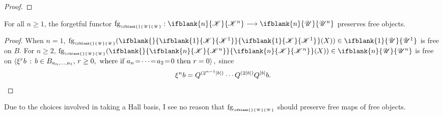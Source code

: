 \documentclass[10pt]{article}
\newcommand{\RestLie}[1]%
{\ifblank{#1}{\mathsf{r}{\scrL}}{\mathsf{r}{\scrL}^{#1}}}
\newcommand{\LL}[1]{\ifblank{#1}{\scrK}{\scrK^{#1}}}
\newcommand{\nontop}[1]{\ifblank{#1}{\scrU}{\scrU^{#1}}}
\newcommand{\iteratedrestn}[2]{\xi^{#2}{#1}}
\newcommand{\forget}[1]{\mathrm{fg}_{\smash{\mbox{\tiny $#1$}}}}
\newcommand{\Fr}[2][]{\ifblank{#1}{#2}{#2_{#1}}}
\renewcommand{\Q}{Q}
\begin{document}
\begin{CategoriesOfInterest}
\begin{proof}
%
\end{proof}
\begin{cor}
For all $n\geq 1$, the forgetful functor $\forget{\nontop{}}:\LL{n}\to\nontop{n}$ preserves free objects.
\end{cor}
\begin{proof}
When $n=1$, $\forget{\nontop{}}(\Fr{\LL{1}}(X))\in\nontop{1}$ is free on $B$. For $n\geq2$, $\forget{\nontop{}}(\Fr{\LL{n}}(X))\in\nontop{n}$  is free on %
$\left\langle \iteratedrestn{b}{r}\,:\,b\in
B_{a_{n},\ldots,a_1},\,r\geq0,\textup{ where if }a_{n}\!=\!\cdots\!=\!a_2\!=\!0\textup{ then $r=0$}\right\rangle,$
 since
\[\iteratedrestn{b}{n}=\Q^{(2^{n-1}|b|)}\cdots \Q^{(2|b|)}\Q^{|b|}b.\qedhere\]
\end{proof}
\noindent Due to the choices involved in taking a Hall basis, I see no reason that $\forget{\nontop{}}$ should preserve free maps of free objects.
\end{CategoriesOfInterest}
\end{document}
